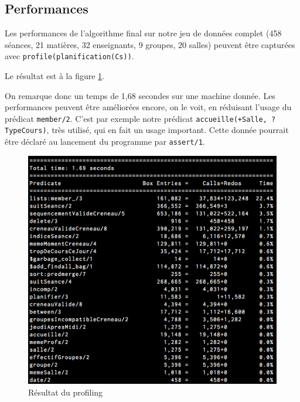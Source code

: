 
\subsection{Performances}

Les performances de l'algorithme final sur notre jeu de données complet (458 séances,
21 matières, 32 enseignants, 9 groupes, 20 salles) peuvent être capturées avec
\texttt{profile(planification(Cs))}.

Le résultat est à la figure \ref{fig:profile}.

On remarque donc un temps de 1,68 secondes sur une machine donnée. Les
performances peuvent être améliorées encore, on le voit, en réduisant l'usage du
prédicat \texttt{member/2}. C'est par exemple notre prédicat
\texttt{accueille(+Salle, ?TypeCours)}, très utilisé, qui en fait un usage
important. Cette donnée pourrait être déclaré au lancement du programme par
\texttt{assert/1}.

\begin{figure}[H]
	\centering
    \includegraphics[keepaspectratio=true,width=12cm]{profile.png}
        \caption{\label{fig:profile} Résultat du profiling }
\end{figure}
